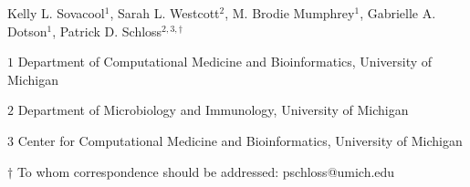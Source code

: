 
\begin{center}
\vspace{25mm}

Kelly L. Sovacool${^1}$, Sarah L. Westcott${^2}$, M. Brodie Mumphrey${^1}$, Gabrielle A. Dotson${^1}$, Patrick D. Schloss$^{2,3,\dagger}$

\vspace{20mm}

$1$ Department of Computational Medicine and Bioinformatics, University of Michigan

$2$ Department of Microbiology and Immunology, University of Michigan

$3$ Center for Computational Medicine and Bioinformatics, University of Michigan

\vspace{30mm}

$\dagger$ To whom correspondence should be addressed: pschloss@umich.edu

\end{center}


\newpage
\linenumbers
